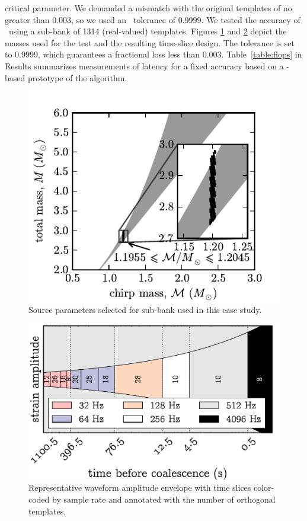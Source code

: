 \documentclass[portrait,plainboxedsections]{sciposter}
\begin{document}
\begin{minipage}[t]{0.25\textwidth}
 critical parameter.  We demanded a mismatch with the original templates of no greater than 0.003, so we used an \SVD\ tolerance of 0.9999.  We tested the accuracy
of \lloid\ using a sub-bank of 1314 (real-valued) templates.  Figures
\ref{fig:tmpltbank} and \ref{fig:time_slices}
depict the masses used for the test and the resulting time-slice design. The
\SVD{} tolerance is set to 0.9999, which guarantees a fractional \SNR{} loss
less than 0.003. Table~\ref{table:flops} in Results summarizes measurements of
latency for a fixed accuracy based on a \gstreamer{}-based prototype of the
\lloid{} algorithm.
%
\begin{figure}[h]
	\includegraphics[width=1.1\textwidth]{figures/tmpltbank}
	\caption{\label{fig:tmpltbank}Source parameters selected for sub-bank used in this
case study.}
\end{figure}
%
\begin{figure}
\includegraphics{figures/envelope}
\caption{\label{fig:time_slices} Representative waveform amplitude envelope with time slices color-coded by sample rate and annotated with the number of orthogonal templates.}
\end{figure}


\end{minipage}
\end{document}
